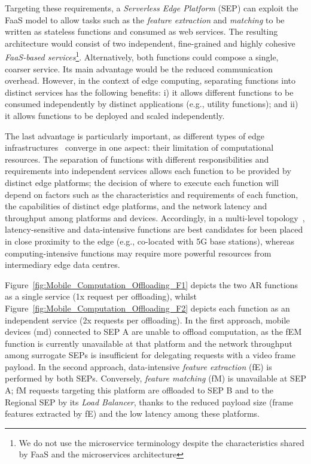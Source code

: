 Targeting these requirements, a \textit{Serverless Edge Platform} (SEP) can exploit the FaaS model to allow tasks such as the \textit{feature extraction} and \textit{matching} to be written as stateless functions and consumed as web services. The resulting architecture would consist of two independent, fine-grained and highly cohesive \textit{FaaS-based services}\footnote{We do not use the microservice terminology despite the  characteristics shared by FaaS and the microservices architecture}. Alternatively, both functions could compose a single, coarser service. Its main advantage would be the reduced communication overhead. However, in the context of edge computing, separating functions into distinct services has the following benefits: i) it allows different functions to be consumed independently by distinct applications (e.g., utility functions); and ii) it allows functions to be deployed and scaled independently.%

The last advantage is particularly important, as different types of edge infrastructures~\cite{Satyanarayanan:2009,Taleb:2013,Liu:2014,K.Wang:2015} converge in one aspect: their limitation of computational resources. The separation of functions with different responsibilities and requirements into independent services allows each function to be provided by distinct edge platforms; the decision of where to execute each function will depend on factors such as the characteristics and requirements of each function, the capabilities of distinct edge platforms, and the network latency and throughput among platforms and devices. Accordingly, in a multi-level topology~\cite{Liu:2014}, latency-sensitive and data-intensive functions are best candidates for been placed in close proximity to the edge (e.g., co-located with 5G base stations), whereas computing-intensive functions may require more powerful resources from intermediary edge data centres.

Figure~\ref{fig:Mobile_Computation_Offloading_F1} depicts the two AR functions as a single service (1x request per offloading), whilst Figure~\ref{fig:Mobile_Computation_Offloading_F2} depicts each function as an independent service (2x requests per offloading). 
In the first approach, mobile devices (md) connected to SEP A are unable to offload computation, as the fEM function is currently unavailable at that platform and the network throughput among surrogate SEPs is insufficient for delegating requests with a video frame payload.
In the second approach, data-intensive \textit{feature extraction} (fE) is performed by both SEPs. Conversely, \textit{feature matching} (fM) is unavailable at SEP A; fM requests targeting this platform are offloaded to SEP B and to the Regional SEP by its \textit{Load Balancer},
thanks to the reduced payload size (frame features extracted by fE) and the low latency among these platforms. 



